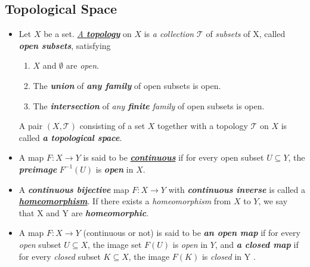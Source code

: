 \documentclass[11pt]{article}
\begin{document}
\subsection{Topological Space}
\begin{itemize}
\item 
\begin{definition} 
Let $X$ be a set. \underline{\emph{A \textbf{topology}}} on $X$ is \emph{a collection} $\mathscr{T}$ of \emph{subsets} of X, called \emph{\textbf{open subsets}}, satisfying
\begin{enumerate}
\item $X$ and $\emptyset$ are \emph{open}.
\item The \emph{\textbf{union}} of \emph{\textbf{any family}} of open subsets is open.
\item The \emph{\textbf{intersection}} of \emph{any \textbf{finite} family} of open subsets is open.
\end{enumerate}
A pair $(X, \mathscr{T})$ consisting of a set $X$ together with a topology $\mathscr{T}$ on $X$ is called \emph{\textbf{a topological space}}.
\end{definition}

\item \begin{definition}
A map $F: X \rightarrow Y$ is said to be \underline{\emph{\textbf{continuous}}} if for every open subset $U \subseteq Y$, the \emph{\textbf{preimage}} $F^{-1}(U)$ is \emph{\textbf{open}} in $X$.
\end{definition}

\item \begin{definition}
A \emph{\textbf{continuous bijective}} map $F: X \rightarrow Y$ with \emph{\textbf{continuous inverse}} is called a \underline{\emph{\textbf{homeomorphism}}}. If there exists a \emph{homeomorphism} from $X$ to $Y$, we say that X and Y are \emph{\textbf{homeomorphic}}.
\end{definition}

\item \begin{definition}
A map $F: X \rightarrow Y$ (continuous or not) is said to be \emph{\textbf{an open map}} if for every \emph{open} subset $U \subseteq X$, the image set $F(U)$ is \emph{open} in $Y$, and  \emph{\textbf{a closed map}} if for every \emph{closed} subset $K \subseteq X$, the image $F(K)$ is \emph{closed} in Y . 
\end{definition}




\end{itemize}
\end{document}
